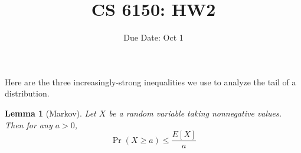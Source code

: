 \documentclass[addpoints]{exam}
\title{CS 6150: HW2}
\date{Due Date: Oct 1}
\newtheorem{lemma}{Lemma}[section]
\begin{document}
\maketitle
\begin{center}
\end{center}

\pointname{}
\bonuspointname{}
\pointformat{[\bfseries\thepoints]}

\printanswers

\begin{center}
  \gradetable
\end{center}
\newpage

Here are the three increasingly-strong inequalities we use to analyze the tail
of a distribution. 

\begin{lemma}[Markov]
  Let $X$ be a random variable taking nonnegative values. Then for any $a > 0$,
\[ \Pr(X \ge a) \le \frac{E[X]}{a} \]
\end{lemma}
\end{document}
